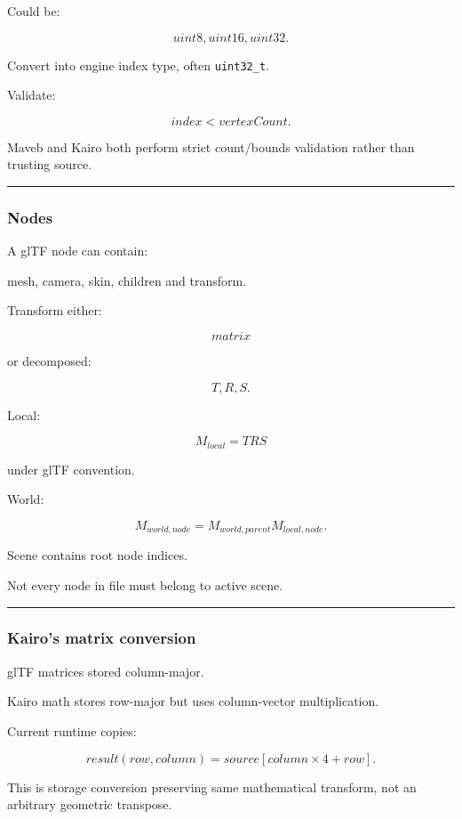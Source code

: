 Could be:

\[
uint8,uint16,uint32.
\]

Convert into engine index type, often \texttt{uint32\_t}.

Validate:

\[
index<vertexCount.
\]

Maveb and Kairo both perform strict count/bounds validation rather than trusting source.

\begin{center}\rule{0.5\linewidth}{0.5pt}\end{center}

\subsubsection{Nodes}\label{nodes}

A glTF node can contain:

mesh, camera, skin, children and transform.

Transform either:

\[
matrix
\]

or decomposed:

\[
T,R,S.
\]

Local:

\[
M_{local}
=
T
R
S
\]

under glTF convention.

World:

\[
\boxed{
M_{world,node}
=
M_{world,parent}
M_{local,node}.
}
\]

Scene contains root node indices.

Not every node in file must belong to active scene.

\begin{center}\rule{0.5\linewidth}{0.5pt}\end{center}

\subsubsection{Kairo's matrix conversion}\label{kairos-matrix-conversion}

glTF matrices stored column-major.

Kairo math stores row-major but uses column-vector multiplication.

Current runtime copies:

\[
result(row,column)
=
source[column\times4+row].
\]

This is storage conversion preserving same mathematical transform, not an arbitrary geometric transpose.

